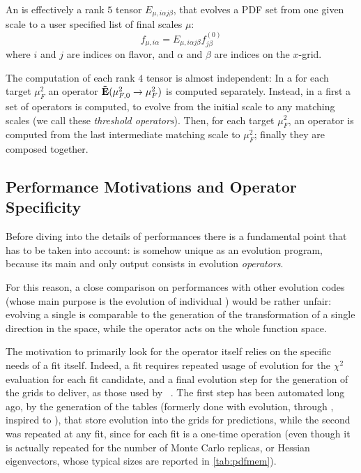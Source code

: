 An \eko{} is effectively a rank $5$ tensor $E_{\mu,i \alpha j \beta}$, that
evolves a PDF set from one given scale to a user specified list of final scales
$\mu$:
\begin{equation}
    f_{\mu,i\alpha} = E_{\mu,i \alpha j \beta} f^{(0)}_{j \beta}
\end{equation}
where $i$ and $j$ are indices on flavor, and $\alpha$ and $\beta$ are indices on the $x$-grid.

The computation of each rank $4$ tensor is almost independent:
In a \ffns{} for each target $\mu_F^2$ an operator $\vb{\tilde E}(\mu_{F,0}^2 \to \mu_F^2)$ is computed separately.
Instead, in a \vfns{} first a set of operators is computed, to evolve from the
initial scale to any matching scales (we call these \textit{threshold
operators}). Then, for each target $\mu_F^2$, an operator is computed
from the last intermediate matching scale to $\mu_F^2$; finally
they are composed together.

\subsection{Performance Motivations and Operator Specificity}
\label{app:code:motiv}

Before diving into the details of \eko{} performances there is a fundamental
point that has to be taken into account: \eko{} is somehow unique as an
evolution program, because its main and only output consists in evolution
\textit{operators}.

For this reason, a close comparison on performances with other evolution codes
(whose main purpose is the evolution of individual \pdfs) would be rather
unfair: evolving a single \pdf{} is comparable to the generation of the
transformation of a single direction in the \pdf{} space, while the operator acts
on the whole function space.

The motivation to primarily look for the operator itself relies on the specific
needs of a \pdf{} fit itself.
Indeed, a fit requires repeated usage of evolution for the $\chi^2$ evaluation
for each fit candidate, and a final evolution step for the generation of the
\pdf{} grids to deliver, as those used by \lhapdf{}~\cite{Buckley:2014ana}.
The first step has been automated long ago, by the generation of the
\fk{} tables (formerly done with \apfel{} evolution, through
\href{https://github.com/NNPDF/apfelcomb}{\apfelcomb}, inspired to
\cite{Bertone:2016lga}), that store \pdf{} evolution into the grids for
predictions, while the second was repeated at any fit, since for each fit is a
one-time operation (even though it is actually repeated for the number of Monte
Carlo replicas, or Hessian eigenvectors, whose typical sizes are reported in
\cref{tab:pdfmem}).

